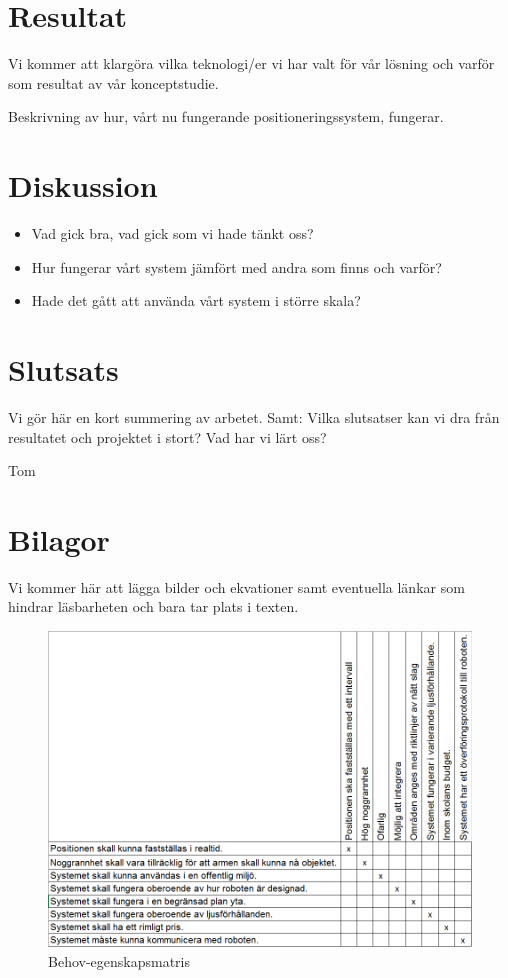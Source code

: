 \documentclass[11pt, a4paper]{report}
\begin{document}
\chapter{Resultat}
Vi kommer att klargöra vilka teknologi/er vi har valt för vår lösning och varför som resultat av vår konceptstudie.

Beskrivning av hur, vårt nu fungerande positioneringssystem, fungerar. 

\chapter{Diskussion}
\begin{itemize}
\item Vad gick bra, vad gick som vi hade tänkt oss?
\item Hur fungerar vårt system jämfört med andra som finns och varför?
\item Hade det gått att använda vårt system i större skala?
\end{itemize} 




\chapter{Slutsats}
Vi gör här en kort summering av arbetet.
Samt:
Vilka slutsatser kan vi dra från resultatet och projektet i stort?
Vad har vi lärt oss?






\newpage
\begin{thebibliography}{99}

 Tom

\end{thebibliography}

\chapter{Bilagor}
Vi kommer här att lägga bilder och ekvationer samt eventuella länkar som hindrar läsbarheten och bara tar plats i texten.

\begin{figure}[H]
	\begin{center}
		\includegraphics [width=12cm,angle=0]{behov-egenskap-matris.png}
		\caption{Behov-egenskapsmatris}
		\label{fig:behov-egenskap}
	\end{center}
\end{figure}
\end{document}
